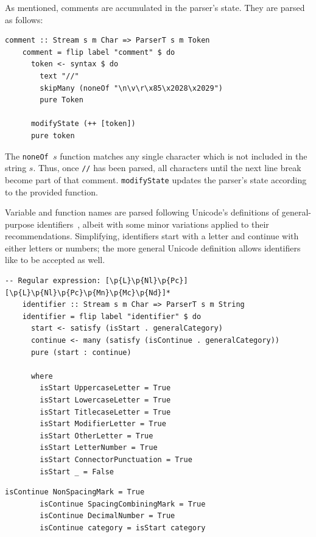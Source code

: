 \documentclass[UdineBachThesis,american,11pt]{PhdThesis}
\begin{document}
  As mentioned, comments are accumulated in the parser's state. They are parsed
  as follows:

  \begin{Verbatim}[gobble=4,fontsize=\small]
    comment :: Stream s m Char => ParserT s m Token
    comment = flip label "comment" $ do
      token <- syntax $ do
        text "//"
        skipMany (noneOf "\n\v\r\x85\x2028\x2029")
        pure Token

      modifyState (++ [token])
      pure token
  \end{Verbatim}

  The \mbox{\texttt{noneOf $s$}} function matches any single character which is
  not included in the string $s$. Thus, once \mbox{\texttt{//}} has been parsed,
  all characters until the next line break become part of that comment.
  \mbox{\texttt{modifyState}} updates the parser's state according to the
  provided function.

  Variable and function names are parsed following Unicode's definitions of
  general-purpose identifiers~\cite{identifier-syntax}, albeit with some minor
  variations applied to their recommendations. Simplifying, identifiers start
  with a letter and continue with either letters or numbers; the more general
  Unicode definition allows identifiers like
  \mbox{\texttt{}} to be accepted as well.

  \begin{Verbatim}[gobble=4,fontsize=\small]
    -- Regular expression: [\p{L}\p{Nl}\p{Pc}][\p{L}\p{Nl}\p{Pc}\p{Mn}\p{Mc}\p{Nd}]*
    identifier :: Stream s m Char => ParserT s m String
    identifier = flip label "identifier" $ do
      start <- satisfy (isStart . generalCategory)
      continue <- many (satisfy (isContinue . generalCategory))
      pure (start : continue)

      where
        isStart UppercaseLetter = True
        isStart LowercaseLetter = True
        isStart TitlecaseLetter = True
        isStart ModifierLetter = True
        isStart OtherLetter = True
        isStart LetterNumber = True
        isStart ConnectorPunctuation = True
        isStart _ = False
  \end{Verbatim}

  \pagebreak

  \begin{Verbatim}[gobble=4,fontsize=\small]
        isContinue NonSpacingMark = True
        isContinue SpacingCombiningMark = True
        isContinue DecimalNumber = True
        isContinue category = isStart category
  \end{Verbatim}
\end{document}
